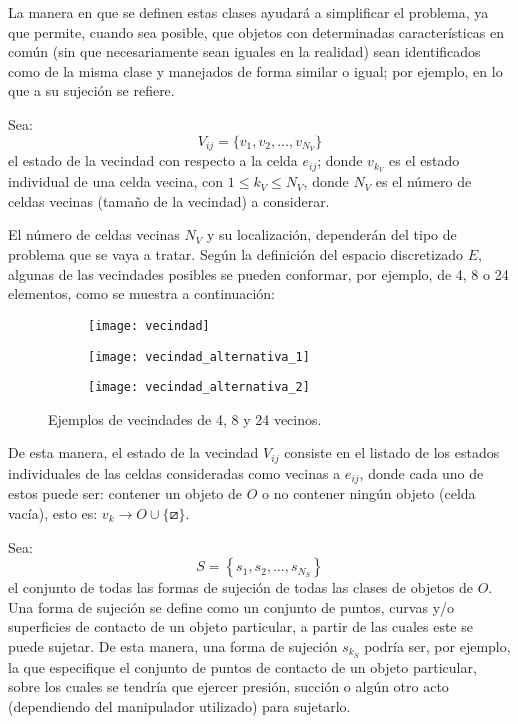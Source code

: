 La manera en que se definen estas clases ayudará a simplificar el problema, ya que permite, cuando sea posible, que objetos con determinadas características en común (sin que necesariamente sean iguales en la realidad) sean identificados como de la misma clase y manejados de forma similar o igual; por ejemplo, en lo que a su sujeción se refiere.

Sea:
%
\begin{equation}
\label{eq:vecindad}
V_{ij} = \{ v_1, v_2, \ldots, v_{N_V} \}
\end{equation}
%
el estado de la vecindad con respecto a la celda $e_{ij}$; donde $v_{k_V}$ es el estado individual de una celda vecina, con $1 \leq k_V \leq N_V$, donde $N_V$ es el número de celdas vecinas (tamaño de la vecindad) a considerar.

El número de celdas vecinas $N_V$ y su localización, dependerán del tipo de problema que se vaya a tratar.
Según la definición del espacio discretizado $E$, algunas de las vecindades posibles se pueden conformar, por ejemplo, de 4, 8 o 24 elementos, como se muestra a continuación:
%
\begin{figure}[H]
    \begin{subfigure}[b]{0.45\textwidth}
		\texttt{[image: vecindad]}%
       	\label{subfig:4_vecinos}%
    \end{subfigure}%
    \hspace{1cm}
    \begin{subfigure}[b]{0.45\textwidth}
       	\texttt{[image: vecindad\_alternativa\_1]}%
       	\label{subfig:8_vecinos}%
    \end{subfigure}%
    
    \begin{subfigure}[b]{0.45\textwidth}
       	\texttt{[image: vecindad\_alternativa\_2]}%
       	\label{subfig:24_vecinos}%
    \end{subfigure}%
    \caption{Ejemplos de vecindades de 4, 8 y 24 vecinos.}%
    \label{fig:vecindades}%
\end{figure}
%
De esta manera, el estado de la vecindad $V_{ij}$ consiste en el listado de los estados individuales de las celdas consideradas como vecinas a $e_{ij}$, donde cada uno de estos puede ser: contener un objeto de $O$ o no contener ningún objeto (celda vacía), esto es: $v_k \rightarrow O \cup \{ \boxslash \}$.

Sea:
%
\begin{equation}
\label{eq:sujecion}
S = \left\{s_1, s_2, \ldots, s_{N_S}\right\}
\end{equation}
%
el conjunto de todas las formas de sujeción de todas las clases de objetos de $O$.
Una forma de sujeción se define como un conjunto de puntos, curvas y/o superficies de contacto de un objeto particular, a partir de las cuales este se puede sujetar.
De esta manera, una forma de sujeción $s_{k_S}$ podría ser, por ejemplo, la que especifique el conjunto de puntos de contacto de un objeto particular, sobre los cuales se tendría que ejercer presión, succión o algún otro acto (dependiendo del manipulador utilizado) para sujetarlo.

